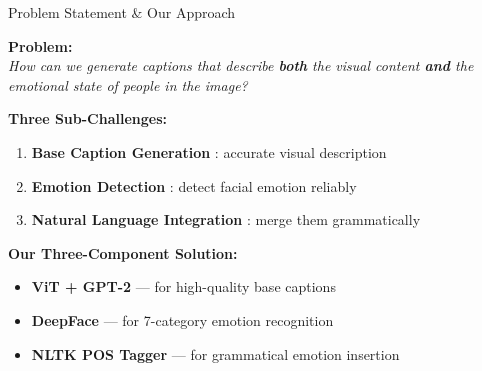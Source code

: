 \documentclass{beamer}
\begin{document}
\begin{frame}{Problem Statement \& Our Approach}

    \textbf{Problem:}\\
    \textit{How can we generate captions that describe \textbf{both} the visual
    content \textbf{and} the emotional state of people in the image?}

    \vspace{0.4cm}
    \textbf{Three Sub-Challenges:}
    \begin{enumerate}
        \item \textbf{Base Caption Generation} : accurate visual description
        \item \textbf{Emotion Detection} : detect facial emotion reliably
        \item \textbf{Natural Language Integration} : merge them grammatically
    \end{enumerate}

    \vspace{0.4cm}
    \textbf{Our Three-Component Solution:}
    \begin{itemize}
        \item \textcolor{vitblue}{\textbf{ViT + GPT-2}} — for high-quality base captions
        \item \textcolor{emotionorange}{\textbf{DeepFace}} — for 7-category emotion recognition
        \item \textcolor{deepgreen}{\textbf{NLTK POS Tagger}} — for grammatical emotion insertion
    \end{itemize}

\end{frame}
\end{document}
